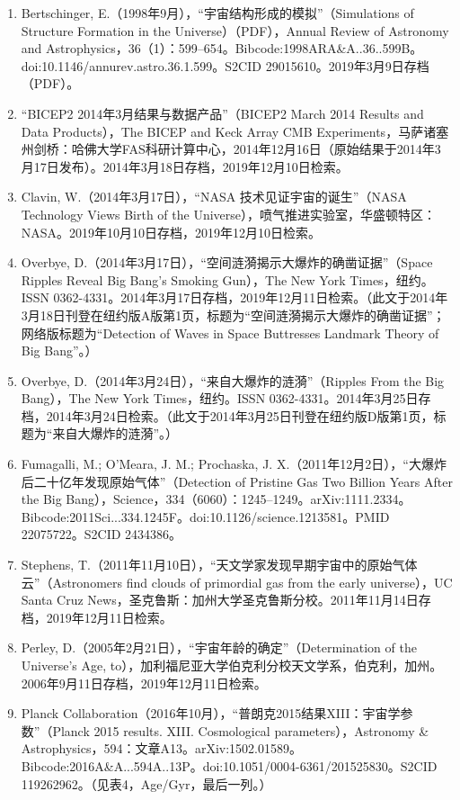 \begin{enumerate}
\item Bertschinger, E.（1998年9月），“宇宙结构形成的模拟”（Simulations of Structure Formation in the Universe）（PDF），Annual Review of Astronomy and Astrophysics，36（1）：599–654。Bibcode:1998ARA&A..36..599B。doi:10.1146/annurev.astro.36.1.599。S2CID 29015610。2019年3月9日存档（PDF）。  
\item “BICEP2 2014年3月结果与数据产品”（BICEP2 March 2014 Results and Data Products），The BICEP and Keck Array CMB Experiments，马萨诸塞州剑桥：哈佛大学FAS科研计算中心，2014年12月16日（原始结果于2014年3月17日发布）。2014年3月18日存档，2019年12月10日检索。  
\item Clavin, W.（2014年3月17日），“NASA 技术见证宇宙的诞生”（NASA Technology Views Birth of the Universe），喷气推进实验室，华盛顿特区：NASA。2019年10月10日存档，2019年12月10日检索。  
\item Overbye, D.（2014年3月17日），“空间涟漪揭示大爆炸的确凿证据”（Space Ripples Reveal Big Bang’s Smoking Gun），The New York Times，纽约。ISSN 0362-4331。2014年3月17日存档，2019年12月11日检索。（此文于2014年3月18日刊登在纽约版A版第1页，标题为“空间涟漪揭示大爆炸的确凿证据”；网络版标题为“Detection of Waves in Space Buttresses Landmark Theory of Big Bang”。）  
\item Overbye, D.（2014年3月24日），“来自大爆炸的涟漪”（Ripples From the Big Bang），The New York Times，纽约。ISSN 0362-4331。2014年3月25日存档，2014年3月24日检索。（此文于2014年3月25日刊登在纽约版D版第1页，标题为“来自大爆炸的涟漪”。）  
\item Fumagalli, M.; O’Meara, J. M.; Prochaska, J. X.（2011年12月2日），“大爆炸后二十亿年发现原始气体”（Detection of Pristine Gas Two Billion Years After the Big Bang），Science，334（6060）：1245–1249。arXiv:1111.2334。Bibcode:2011Sci...334.1245F。doi:10.1126/science.1213581。PMID 22075722。S2CID 2434386。  
\item Stephens, T.（2011年11月10日），“天文学家发现早期宇宙中的原始气体云”（Astronomers find clouds of primordial gas from the early universe），UC Santa Cruz News，圣克鲁斯：加州大学圣克鲁斯分校。2011年11月14日存档，2019年12月11日检索。  
\item Perley, D.（2005年2月21日），“宇宙年龄的确定”（Determination of the Universe’s Age, to），加利福尼亚大学伯克利分校天文学系，伯克利，加州。2006年9月11日存档，2019年12月11日检索。  
\item Planck Collaboration（2016年10月），“普朗克2015结果XIII：宇宙学参数”（Planck 2015 results. XIII. Cosmological parameters），Astronomy & Astrophysics，594：文章A13。arXiv:1502.01589。Bibcode:2016A&A...594A..13P。doi:10.1051/0004-6361/201525830。S2CID 119262962。（见表4，Age/Gyr，最后一列。）
\end{enumerate}








